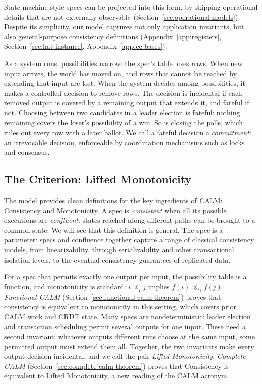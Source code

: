 \documentclass[sigconf]{cidr-2027}
\theoremstyle{remark}
\newcommand{\InputOrd}{\preceq_I}
\newcommand{\OutputOrd}{\preceq_O}
\newcommand{\commitment}{commitment\xspace}
\newcommand{\outrel}{extends\xspace}          %
\newcommand{\outrelbase}{extend\xspace}       %
\begin{document}
State-machine-style specs can be projected into this form, by skipping
operational details that are not externally observable (Section~\ref{sec:operational-models}).
Despite its simplicity, our model captures not only application invariants,
but also general-purpose consistency definitions (Appendix~\ref{app:registers},
Section~\ref{sec:hat-instance}, Appendix~\ref{app:cc-bases}).

As a system runs, possibilities narrow: the spec's table loses rows.  When new
input arrives, the world has moved on, and rows that cannot be reached by
extending that input are lost.  When the system decides among possibilities, it
makes a controlled decision to remove rows.  The decision is incidental if each
removed output is covered by a remaining output that \outrel it, and fateful if
not.  Choosing between two candidates in a leader election is fateful: nothing
remaining covers the loser's possibility of a win.  So is closing the polls,
which rules out every row with a later ballot.  We call a fateful decision a
\emph{\commitment}: an irrevocable decision, enforceable by coordination
mechanisms such as locks and consensus.

\subsection{The Criterion: Lifted Monotonicity}
The model provides clean definitions for the key ingredients of CALM:
Consistency and Monotonicity.  A spec is \emph{consistent} when all its possible
executions are \emph{confluent}: states reached along different paths can be
brought to a common state.  We will see that this definition is general.  The spec is a parameter:
specs and confluence together capture a range of classical consistency models,
from linearizability, through serializability and other transactional isolation
levels, to the eventual consistency guarantees of replicated data.

For a spec that permits exactly one output per input, the possibility table is a
function, and monotonicity is standard: $i\InputOrd j$ implies
$f(i)\OutputOrd f(j)$.  \emph{Functional CALM} (Section~\ref{sec:functional-calm-theorem})
proves that consistency is equivalent to monotonicity in this setting, which
covers prior CALM work and CRDT state.  Many specs are nondeterministic: leader
election and transaction scheduling permit several outputs for one input.
These need a second invariant: whatever outputs different runs choose at the
same input, some permitted output must \outrelbase them all.  Together, the two
invariants make every output decision incidental, and we call the pair
\emph{Lifted Monotonicity}.  \emph{Complete CALM} (Section~\ref{sec:complete-calm-theorem})
proves that Consistency is equivalent to Lifted Monotonicity, a new reading of
the CALM acronym.
\end{document}

